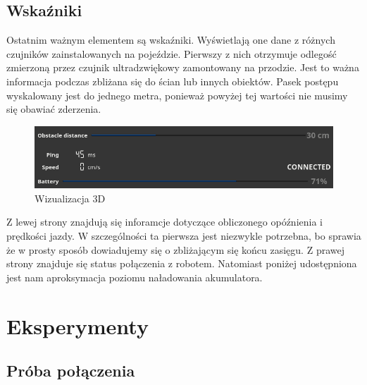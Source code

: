\documentclass[12pt,a4paper,polish]{article}
\begin{document}
  \subsection{Wskaźniki}
  Ostatnim ważnym elementem są wskaźniki. Wyświetlają one dane z różnych
  czujników zainstalowanych na pojeździe. Pierwszy z nich otrzymuje odlegość
  zmierzoną przez czujnik ultradzwiękowy zamontowany na przodzie. Jest to 
  ważna informacja podczas zbliżana się do ścian lub innych obiektów.
  Pasek postępu wyskalowany jest do jednego metra, ponieważ powyżej tej 
  wartości nie musimy się obawiać zderzenia.

  \begin{figure}[h]
    \centering
    \includegraphics[width=1\textwidth]{img/final/wska.png}
    \caption{Wizualizacja 3D}
    \label{fig:indications}
  \end{figure}

  Z lewej strony znajdują się inforamcje dotyczące obliczonego opóźnienia i
  prędkości jazdy. W szczególności ta pierwsza jest niezwykle potrzebna, bo
  sprawia że w prosty sposób dowiadujemy się o zbliżającym się końcu zasięgu.
  Z prawej strony znajduje się status połączenia z robotem. Natomiast poniżej
  udostępniona jest nam aproksymacja poziomu naładowania akumulatora.


  \section{Eksperymenty}

  \subsection{Próba połączenia}
\end{document}
